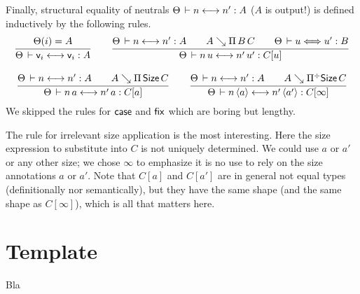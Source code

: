 \documentclass[acmlarge,review,anonymous]{acmart}\settopmatter{printfolios=true}
\begin{document}
Finally, structural equality of neutrals $\Theta \,\vdash n \mathrel{\longleftrightarrow} n' : A$ ($A$ is output!)
is defined inductively by the following rules.
\begin{gather*}
  \ru{\The(i) = A
    }{\The \der \ind i \eqinf \ind i : A}
\qquad
  \ru{\The \der n \eqinf n' : A \qquad
      A \evalsto \piT B C \qquad
      \The \der u \eqchk u' : B
    }{\The \der n\,u \eqinf n'\,u' : C[u]}
\\[2ex]
  \ru{\The \der n \eqinf n' : A \qquad
      A \evalsto \piT \Size C
    }{\The \der n\,a \eqinf n'\,a : C[a]}
\qquad
  \ru{\The \der n \eqinf n' : A \qquad
      A \evalsto \erpiT \Size C
    }{\The \der n\,\ann a \eqinf n'\,\ann{a'} : C[\infty]}
\end{gather*}
We skipped the rules for $\mathsf{case}$ and $\mathsf{fix}$ which are boring but lengthy.

The rule for irrelevant size application is the most interesting.  Here the size expression to substitute into $C$ is not uniquely determined.  We could use $a$ or $a'$ or any other size; we chose $\infty$ to emphasize it is no use to rely on the size annotations $a$ or $a'$.  Note that $C[a]$ and $C[a']$ are in general not equal types (definitionally nor semantically), but they have the same shape (and the same shape as $C[\infty]$), which is all that matters here.

\newpage

\section{Template}

Bla
\end{document}
